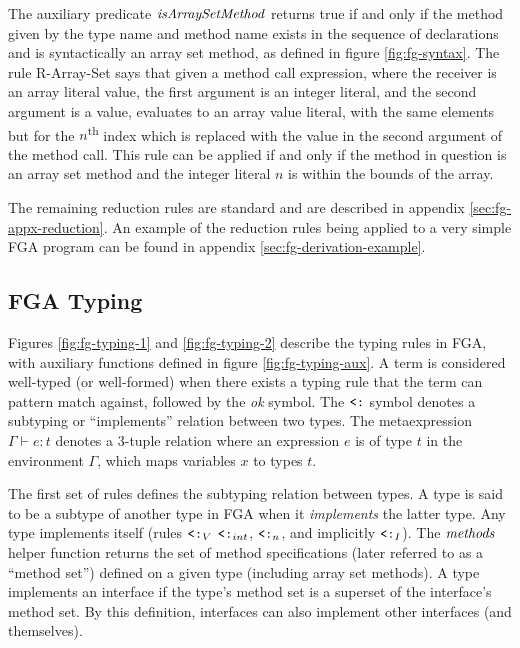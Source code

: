 The auxiliary predicate $\mathit{isArraySetMethod}$ returns true if and only if the
method given by the type name and method name exists in the sequence of
declarations and is syntactically an array set method, as defined in figure
\ref{fig:fg-syntax}. The rule R-Array-Set says that given a method call
expression, where the receiver is an array literal value, the first argument is
an integer literal, and the second argument is a value, evaluates to an array
value literal, with the same elements but for the $n$\textsuperscript{th} index
which is replaced with the value in the second argument of the method call. This
rule can be applied if and only if the method in question is an array set method
and the integer literal $n$ is within the bounds of the array.

The remaining reduction rules are standard and are described in
appendix \ref{sec:fg-appx-reduction}. An example of the reduction
rules being applied to a very simple FGA program can be found in appendix
\ref{sec:fg-derivation-example}.



\subsection{FGA Typing}

Figures \ref{fig:fg-typing-1} and \ref{fig:fg-typing-2} describe the typing
rules in FGA, with auxiliary functions defined in figure
\ref{fig:fg-typing-aux}. A term is considered well-typed (or well-formed) when
there exists a typing rule that the term can pattern match against, followed by
the \emph{ok} symbol. The $\mathbin{\texttt{<:}}$ symbol denotes a subtyping or ``implements''
relation between two types. The metaexpression $\Gamma \vdash e : t$ denotes a
3-tuple relation where an expression $e$ is of type $t$ in the environment
$\Gamma$, which maps variables $x$ to types $t$.

The first set of rules defines the subtyping relation between types. A type is
said to be a subtype of another type in FGA when it \emph{implements} the latter
type. Any type implements itself (rules $\mathbin{\texttt{<:}}_V$ $\mathbin{\texttt{<:}}_{int}$, $\mathbin{\texttt{<:}}_n$, and
implicitly $\mathbin{\texttt{<:}}_I$). The $\mathit{methods}$ helper function returns the set of method
specifications (later referred to as a ``method set'') defined on a given type
(including array set methods). A type implements an interface if the type's
method set is a superset of the interface's method set. By this definition,
interfaces can also implement other interfaces (and themselves).

